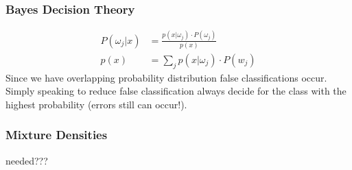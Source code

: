 \subsubsection{Bayes Decision Theory}
\label{sssect:bayes-decision-theory}
\begin{align*}
P(\omega_j |x) &= \frac{p(x|\omega_j) \cdot P(\omega_j)}{p(x)} \\
p(x) &= \sum_j p(x|\omega_j) \cdot P(w_j)
\end{align*}
Since we have overlapping probability distribution false classifications occur. Simply speaking to reduce false classification always decide for the class with the highest probability (errors still can occur!).

\subsubsection{Mixture Densities}
\label{sssect:mixture-densities}
needed???
